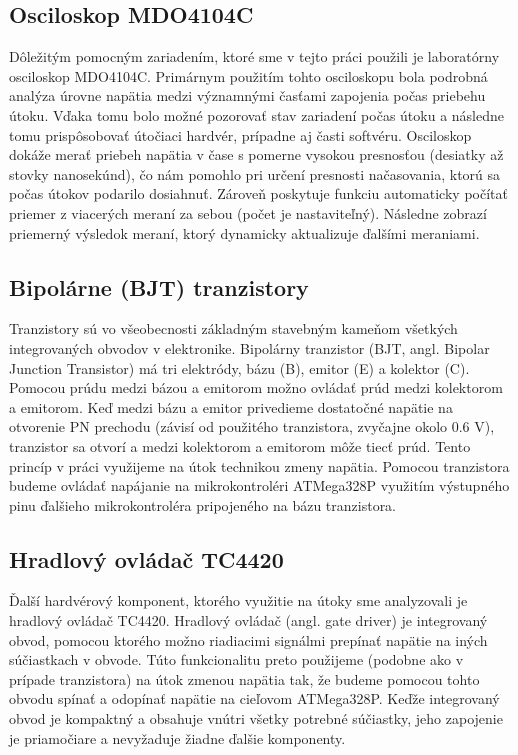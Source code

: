 \subsection{Osciloskop MDO4104C}
Dôležitým pomocným zariadením, ktoré sme v tejto práci použili je laboratórny osciloskop MDO4104C. Primárnym použitím tohto osciloskopu bola podrobná analýza úrovne napätia medzi významnými časťami zapojenia počas priebehu útoku. Vďaka tomu bolo možné pozorovať stav zariadení počas útoku a následne tomu prispôsobovať útočiaci hardvér, prípadne aj časti softvéru. Osciloskop dokáže merať priebeh napätia v čase s pomerne vysokou presnosťou (desiatky až stovky nanosekúnd), čo nám pomohlo pri určení presnosti načasovania, ktorú sa počas útokov podarilo dosiahnuť. Zároveň poskytuje funkciu automaticky počítať priemer z viacerých meraní za sebou (počet je nastaviteľný). Následne zobrazí priemerný výsledok meraní, ktorý dynamicky aktualizuje ďalšími meraniami.

\subsection{Bipolárne (BJT) tranzistory}
Tranzistory sú vo všeobecnosti základným stavebným kameňom všetkých integrovaných obvodov v elektronike. Bipolárny tranzistor (BJT, angl. Bipolar Junction Transistor) má tri elektródy, bázu (B), emitor (E) a kolektor (C). Pomocou prúdu medzi bázou a emitorom možno ovládať prúd medzi kolektorom a emitorom. Keď medzi bázu a emitor privedieme dostatočné napätie na otvorenie PN prechodu (závisí od použitého tranzistora, zvyčajne okolo 0.6 V), tranzistor sa otvorí a medzi kolektorom a emitorom môže tiecť prúd. Tento princíp v práci využijeme na útok technikou zmeny napätia. Pomocou tranzistora budeme ovládať napájanie na mikrokontroléri ATMega328P využitím výstupného pinu ďalšieho mikrokontroléra pripojeného na bázu tranzistora.

\subsection{Hradlový ovládač TC4420}
Ďalší hardvérový komponent, ktorého využitie na útoky sme analyzovali je hradlový ovládač TC4420. Hradlový ovládač (angl. gate driver) je integrovaný obvod, pomocou ktorého možno riadiacimi signálmi prepínať napätie na iných súčiastkach v obvode. Túto funkcionalitu preto použijeme (podobne ako v prípade tranzistora) na útok zmenou napätia tak, že budeme pomocou tohto obvodu spínať a odopínať napätie na cieľovom ATMega328P. Keďže integrovaný obvod je kompaktný a obsahuje vnútri všetky potrebné súčiastky, jeho zapojenie je priamočiare a nevyžaduje žiadne ďalšie komponenty.